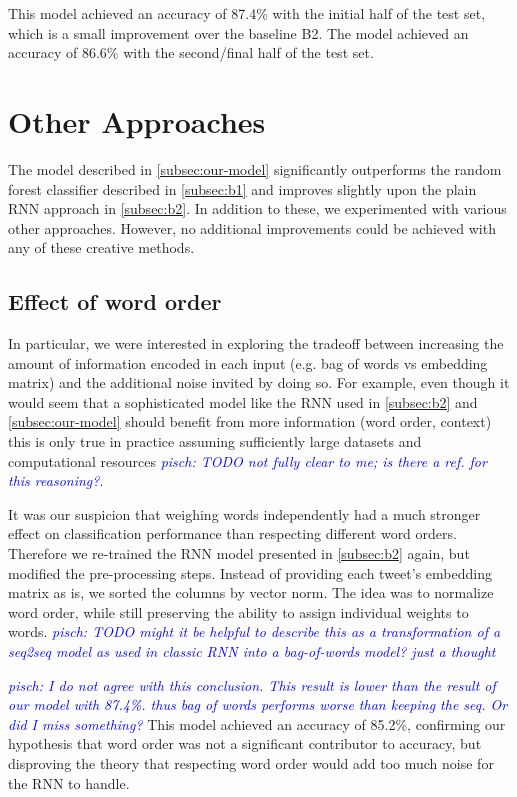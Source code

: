 \documentclass[10pt,conference,compsocconf]{IEEEtran}
\newcommand{\pisch}[1]{\textit{\textcolor{blue}{pisch: #1}}}
\begin{document}
This model achieved an accuracy of 87.4\% with the initial half of the test set,
which is a small improvement over the baseline B2.
The model achieved an accuracy of 86.6\% with the second/final half of the test set.

\section{Other Approaches} \label{sec:other}

The model described in \autoref{subsec:our-model} significantly outperforms
the random forest classifier described in \autoref{subsec:b1} and improves
slightly upon the plain RNN approach in \autoref{subsec:b2}. In addition to
these, we experimented with various other approaches.
However, no additional improvements could be achieved with
any of these creative methods.

\subsection*{Effect of word order}

In particular, we were interested in exploring the tradeoff between
increasing the amount of information encoded in each input (e.g. bag
of words vs embedding matrix) and the additional noise invited by
doing so. For example, even though it would seem that a sophisticated
model like the RNN used in \autoref{subsec:b2} and \autoref{subsec:our-model}
should benefit from more information (word order, context) this is only true
in practice assuming sufficiently large datasets and computational
resources \pisch{TODO not fully clear to me; is there a ref. for this reasoning?}.

It was our suspicion that weighing words independently had a much
stronger effect on classification performance than respecting
different word orders. Therefore we re-trained the RNN model presented
in \autoref{subsec:b2} again, but modified the pre-processing steps. Instead
of providing each tweet's embedding matrix as is, we sorted the
columns by vector norm. The idea was to normalize word order, while
still preserving the ability to assign individual weights to
words.
\pisch{TODO might it be helpful to describe this as a transformation of a
seq2seq model as used in classic RNN into a bag-of-words model?
just a thought}


\pisch{I do not agree with this conclusion. This result is lower than
the result of our model with 87.4\%. thus bag of words performs
worse than keeping the seq. Or did I miss something?}
This model achieved an accuracy of 85.2\%, confirming our hypothesis
that word order was not a significant contributor to accuracy, but
disproving the theory that respecting word order would add too much
noise for the RNN to handle.
\end{document}
